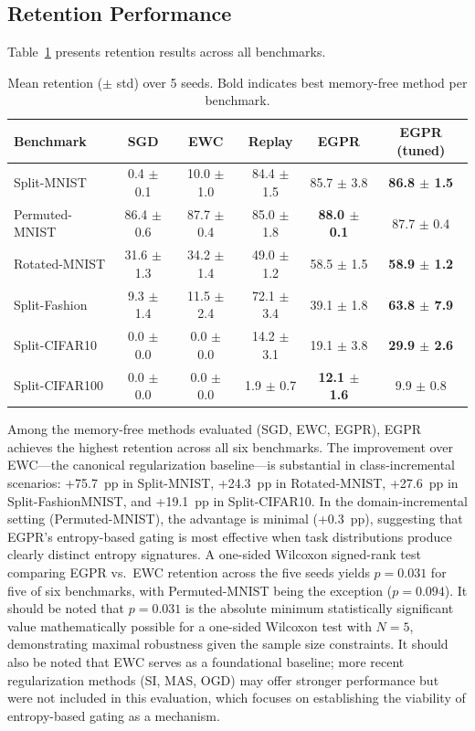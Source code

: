 \documentclass[11pt,a4paper]{article}
\begin{document}
\subsection{Retention Performance}

Table~\ref{tab:retention} presents retention results across all benchmarks.

\begin{table}[htbp]
\centering
\caption{Mean retention ($\pm$ std) over 5 seeds. Bold indicates best memory-free method per benchmark.}
\label{tab:retention}
\begin{tabular}{lccccc}
\toprule
Benchmark & SGD & EWC & Replay & EGPR & EGPR (tuned) \\
\midrule
Split-MNIST & 0.4 $\pm$ 0.1 & 10.0 $\pm$ 1.0 & 84.4 $\pm$ 1.5 & 85.7 $\pm$ 3.8 & \textbf{86.8 $\pm$ 1.5} \\
Permuted-MNIST & 86.4 $\pm$ 0.6 & 87.7 $\pm$ 0.4 & 85.0 $\pm$ 1.8 & \textbf{88.0 $\pm$ 0.1} & 87.7 $\pm$ 0.4 \\
Rotated-MNIST & 31.6 $\pm$ 1.3 & 34.2 $\pm$ 1.4 & 49.0 $\pm$ 1.2 & 58.5 $\pm$ 1.5 & \textbf{58.9 $\pm$ 1.2} \\
Split-Fashion & 9.3 $\pm$ 1.4 & 11.5 $\pm$ 2.4 & 72.1 $\pm$ 3.4 & 39.1 $\pm$ 1.8 & \textbf{63.8 $\pm$ 7.9} \\
Split-CIFAR10 & 0.0 $\pm$ 0.0 & 0.0 $\pm$ 0.0 & 14.2 $\pm$ 3.1 & 19.1 $\pm$ 3.8 & \textbf{29.9 $\pm$ 2.6} \\
Split-CIFAR100 & 0.0 $\pm$ 0.0 & 0.0 $\pm$ 0.0 & 1.9 $\pm$ 0.7 & \textbf{12.1 $\pm$ 1.6} & 9.9 $\pm$ 0.8 \\
\bottomrule
\end{tabular}
\end{table}

Among the memory-free methods evaluated (SGD, EWC, EGPR), EGPR achieves the highest retention across all six benchmarks. The improvement over EWC---the canonical regularization baseline---is substantial in class-incremental scenarios: +75.7~pp in Split-MNIST, +24.3~pp in Rotated-MNIST, +27.6~pp in Split-FashionMNIST, and +19.1~pp in Split-CIFAR10. In the domain-incremental setting (Permuted-MNIST), the advantage is minimal (+0.3~pp), suggesting that EGPR's entropy-based gating is most effective when task distributions produce clearly distinct entropy signatures. A one-sided Wilcoxon signed-rank test comparing EGPR vs.\ EWC retention across the five seeds yields $p = 0.031$ for five of six benchmarks, with Permuted-MNIST being the exception ($p = 0.094$). It should be noted that $p = 0.031$ is the absolute minimum statistically significant value mathematically possible for a one-sided Wilcoxon test with $N=5$, demonstrating maximal robustness given the sample size constraints. It should also be noted that EWC serves as a foundational baseline; more recent regularization methods (SI, MAS, OGD) may offer stronger performance but were not included in this evaluation, which focuses on establishing the viability of entropy-based gating as a mechanism.
\end{document}
